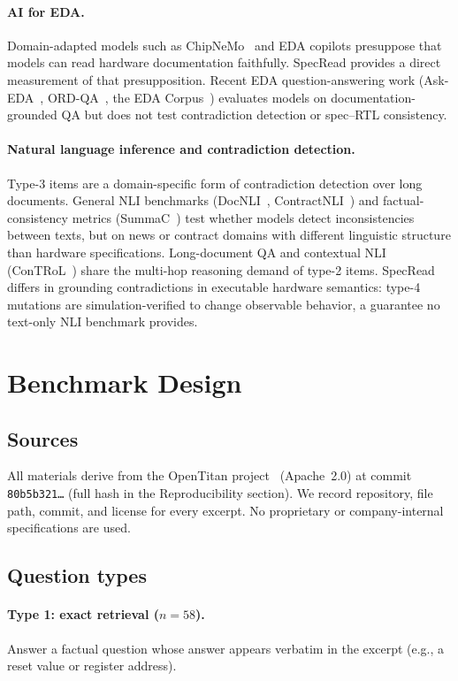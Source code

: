 \documentclass[11pt]{article}
\begin{document}
\paragraph{AI for EDA.} Domain-adapted models such as ChipNeMo~\cite{chipnemo} and EDA copilots presuppose that models can read hardware documentation faithfully. SpecRead provides a direct measurement of that presupposition. Recent EDA question-answering work (Ask-EDA~\cite{askeda}, ORD-QA~\cite{ordqa}, the EDA Corpus~\cite{edacorpus}) evaluates models on documentation-grounded QA but does not test contradiction detection or spec--RTL consistency.

\paragraph{Natural language inference and contradiction detection.} Type-3 items are a domain-specific form of contradiction detection over long documents. General NLI benchmarks (DocNLI~\cite{docnli}, ContractNLI~\cite{contractnli}) and factual-consistency metrics (SummaC~\cite{summac}) test whether models detect inconsistencies between texts, but on news or contract domains with different linguistic structure than hardware specifications. Long-document QA and contextual NLI (ConTRoL~\cite{control}) share the multi-hop reasoning demand of type-2 items. SpecRead differs in grounding contradictions in executable hardware semantics: type-4 mutations are simulation-verified to change observable behavior, a guarantee no text-only NLI benchmark provides.

\section{Benchmark Design}
\subsection{Sources}
All materials derive from the OpenTitan project~\cite{opentitan} (Apache~2.0) at commit \texttt{80b5b321\ldots} (full hash in the Reproducibility section). We record repository, file path, commit, and license for every excerpt. No proprietary or company-internal specifications are used.

\subsection{Question types}
\paragraph{Type 1: exact retrieval ($n{=}58$).} Answer a factual question whose answer appears verbatim in the excerpt (e.g., a reset value or register address).
\end{document}
